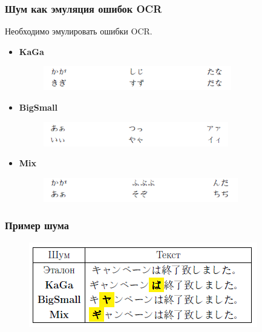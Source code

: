 \documentclass[aspectratio=169, pdf, 9pt, utf8]{beamer}
\begin{document}
\begin{frame}
	\frametitle{Шум как эмуляция ошибок OCR}
	
	Необходимо эмулировать ошибки OCR.
	
	\begin{itemize}
		\item \textbf{KaGa}
		
		\begin{center}
			\begin{figure}[H]
				\includegraphics[height=30pt]{p_KG.png}
			\end{figure}
		\end{center}
		
		\item \textbf{BigSmall}
			\begin{center}
			\begin{figure}[H]
				\includegraphics[height=30pt]{p_BS.png}
			\end{figure}
		\end{center}
		
		\item \textbf{Mix}
			\begin{center}
			\begin{figure}[H]
				\includegraphics[height=30pt]{p_MX.png}
			\end{figure}
		\end{center}
	\end{itemize}
\end{frame}

\begin{frame}
	\frametitle{Пример шума}
	
	\begin{center}
		\begin{figure}[H]
			\includegraphics{p_noise.png}
		\end{figure}
	\end{center}
\end{frame}
\end{document}
